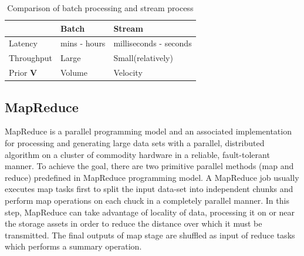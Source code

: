 \begin{table}[H] %
\begin{tabular}{p{3.2cm} p{4.2cm} p{4.2cm}} 
\toprule %
  & Batch  & Stream \\ 
\hline 
 {\small Latency} & {\small mins - hours} & {\small milliseconds - seconds} \\
 {\small Throughput} & {\small Large} & {\small Small(relatively)}\\
 {\small Prior \textbf{V}} & {\small Volume} & {\small Velocity}\\   
\bottomrule
\end{tabular} %
\caption{Comparison of batch processing and stream process} 
\label{table:BatchVSStream}
\end{table}

\subsection{MapReduce}
MapReduce is a parallel programming model and an associated implementation for processing and generating large data sets with a parallel, distributed algorithm on a cluster  of commodity hardware in a reliable, fault-tolerant manner. \cite{dean2008mapreduce} To achieve the goal, there are two primitive parallel methods (map and reduce) predefined in MapReduce programming model. A MapReduce job usually executes map tasks first to split the input data-set into independent chunks and perform map operations on each chuck in a completely parallel manner. In this step,  MapReduce can take advantage of locality of data, processing it on or near the storage assets in order to reduce the distance over which it must be transmitted. The final outputs of map stage are shuffled as input of reduce tasks which performs a summary operation. 

